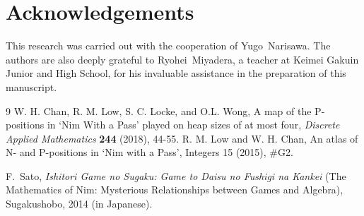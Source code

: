 \documentclass{article}
\theoremstyle{definition}
\theoremstyle{plain}
\theoremstyle{remark}
\begin{document}
\section*{Acknowledgements}

This research was carried out with the cooperation of Yugo~Narisawa.
The authors are also deeply grateful to Ryohei~Miyadera, a teacher at Keimei Gakuin Junior and High School, for his invaluable assistance in the preparation of this manuscript.

\begin{thebibliography}{9}
 W. H. Chan,  R. M. Low, S. C. Locke, and O.L. Wong, A map of the P-positions in ‘Nim With a Pass’ played on heap sizes of at most four, {\it Discrete Applied Mathematics}  {\bf 244} (2018), 44-55.
 R. M. Low and W. H. Chan, An atlas of N- and P-positions in `Nim with a Pass', Integers 15 (2015), \#G2.

F.~Sato,
\emph{Ishitori Game no Sugaku: Game to Daisu no Fushigi na Kankei}
(The Mathematics of Nim: Mysterious Relationships between Games and Algebra),
Sugakushobo, 2014 (in Japanese).




\end{thebibliography}
\end{document}
